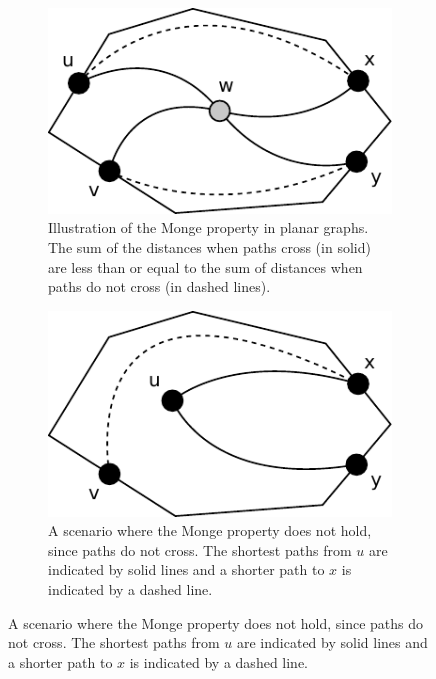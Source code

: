 \begin{figure}
  \centering
  \caption{}
  \begin{subfigure}[b]{0.45\textwidth}
    \includegraphics[width=\textwidth]{figs/monge.pdf}
    \caption{Illustration of the Monge property in planar graphs. The sum of the distances
  when paths cross (in solid) are less than or equal to the sum of distances when paths
do not cross (in dashed lines).}
    \label{monge}
  \end{subfigure}
  \quad
  \begin{subfigure}[b]{0.45\textwidth}
    \includegraphics[width=\textwidth]{figs/monge2.pdf}
    \caption{A scenario where the Monge property does not hold, since paths
      do not cross. The shortest paths from $u$ are
      indicated by solid lines and a shorter path to $x$ is indicated by a dashed line.}
    \label{monge2}
  \end{subfigure}
\end{figure}

